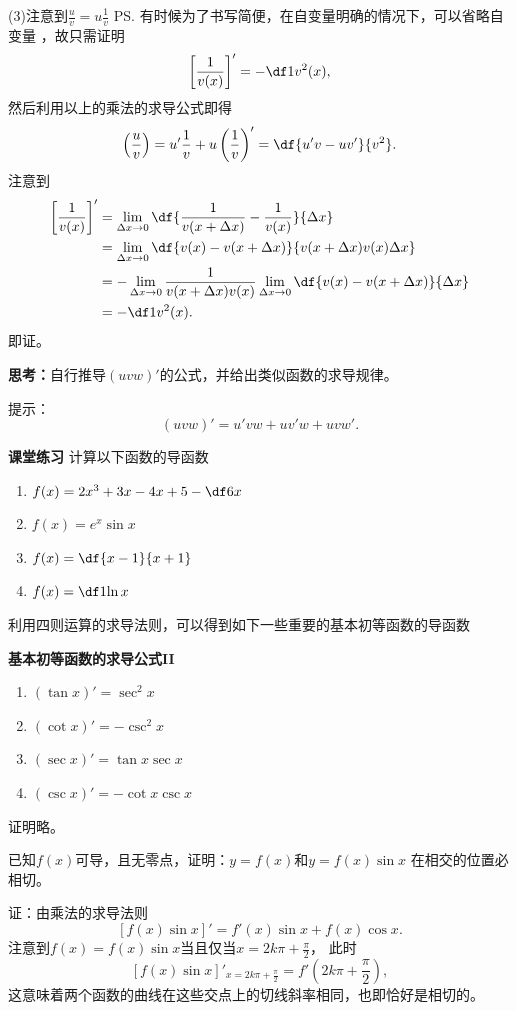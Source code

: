 (3)注意到$\frac uv=u\frac1v$
\ps{有时候为了书写简便，在自变量明确的情况下，可以省略自变量}
，故只需证明
$$\left[\frac1{v(x)}\right]'=-\df1{v^2(x)},$$
然后利用以上的乘法的求导公式即得
$$\left(\frac uv\right)=u'\frac1v+u\left(\frac 1v\right)'
=\df{u'v-uv'}{v^2}.$$
注意到
\begin{align*}
	\left[\frac{1}{v(x)}\right]'
	&=\lim\limits_{\Delta x\to 0}
	\df{\frac1{v(x+\Delta x)}-\frac1{v(x)}}{\Delta x}\\
	&=\lim\limits_{\Delta x\to 0}
	\df{v(x)-v(x+\Delta x)}{v(x+\Delta x)v(x)\Delta x}\\
	&=-\lim\limits_{\Delta x\to 0}\frac1{v(x+\Delta x)v(x)}
	\lim\limits_{\Delta x\to 0}\df{v(x)-v(x+\Delta x)}{\Delta x}\\
	&=-\df1{v^2(x)}.
\end{align*}
即证。\fin

\bs
{\bf 思考：}自行推导$(uvw)'$的公式，并给出类似函数的求导规律。

\ifhint
提示：
$$(uvw)'=u'vw+uv'w+uvw'.$$
\fi

\bs
{\bf 课堂练习} 计算以下函数的导函数
\begin{enumerate}[(1)]
  \setlength{\itemindent}{1cm}
  \item $f(x)=2x^3+3x-4x+5-\df 6x$ 
  \item $f(x)=e^x\sin x$ 
  \item $f(x)=\df{x-1}{x+1}$ 
  \item $f(x)=\df 1{\ln x}$ 
\end{enumerate}

\bs
利用四则运算的求导法则，可以得到如下一些重要的基本初等函数的导函数
\begin{thx}
	{\bf 基本初等函数的求导公式II}
	\begin{enumerate}[(1)]
		\item $(\tan x)'=\sec^2x$
		\item $(\cot x)'=-\csc^2x$
		\item $(\sec x)'=\tan x\sec x$
		\item $(\csc x)'=-\cot x\csc x$
	\end{enumerate}
\end{thx}

证明略。

\bs
\egz 已知$f(x)$可导，且无零点，证明：$y=f(x)$和$y=f(x)\sin x$
在相交的位置必相切。

证：由乘法的求导法则
$$[f(x)\sin x]'=f'(x)\sin x+f(x)\cos x.$$
注意到$f(x)=f(x)\sin x$当且仅当$x=2k\pi+\frac{\pi}2$，
此时
$$[f(x)\sin x]'_{x=2k\pi+\frac{\pi}2}=f'(2k\pi+\frac{\pi}2),$$
这意味着两个函数的曲线在这些交点上的切线斜率相同，也即恰好是相切的。\fin

